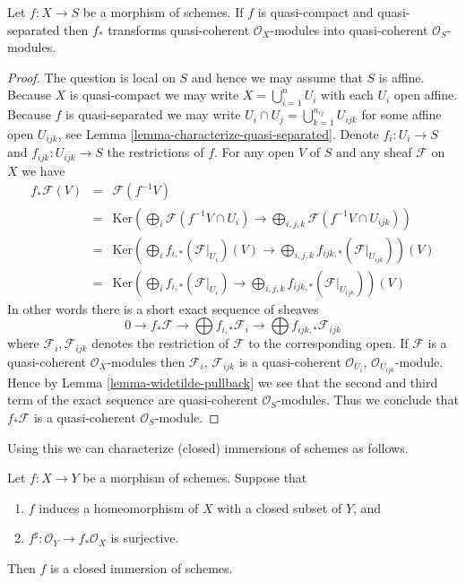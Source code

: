 \begin{lemma}
\label{lemma-push-forward-quasi-coherent}
Let $f : X \to S$ be a morphism of schemes.
If $f$ is quasi-compact and quasi-separated then
$f_*$ transforms quasi-coherent $\mathcal{O}_X$-modules
into quasi-coherent $\mathcal{O}_S$-modules.
\end{lemma}

\begin{proof}
The question is local on $S$ and hence we may assume that
$S$ is affine. Because $X$ is quasi-compact we may write
$X = \bigcup_{i = 1}^n U_i$ with each $U_i$ open affine.
Because $f$ is quasi-separated we may write
$U_i \cap U_j = \bigcup_{k = 1}^{n_{ij}} U_{ijk}$ for some
affine open $U_{ijk}$, see Lemma \ref{lemma-characterize-quasi-separated}.
Denote $f_i : U_i \to S$ and $f_{ijk} : U_{ijk} \to S$ the
restrictions of $f$. For any open $V$ of $S$ and any sheaf
$\mathcal{F}$ on $X$ we have
\begin{eqnarray*}
f_*\mathcal{F}(V) & = & \mathcal{F}(f^{-1}V) \\
& = &
\text{Ker}\left(
\bigoplus\nolimits_i \mathcal{F}(f^{-1}V \cap U_i)
\to
\bigoplus\nolimits_{i, j, k} \mathcal{F}(f^{-1}V \cap U_{ijk})\right) \\
& = &
\text{Ker}\left(
\bigoplus\nolimits_i f_{i, *}(\mathcal{F}|_{U_i})(V)
\to
\bigoplus\nolimits_{i, j, k} f_{ijk, *}(\mathcal{F}|_{U_{ijk}})\right)(V) \\
& = &
\text{Ker}\left(
\bigoplus\nolimits_i f_{i, *}(\mathcal{F}|_{U_i})
\to
\bigoplus\nolimits_{i, j, k} f_{ijk, *}(\mathcal{F}|_{U_{ijk}})\right)(V)
\end{eqnarray*}
In other words there is a short exact sequence of sheaves
$$
0 \to f_*\mathcal{F}
\to \bigoplus f_{i, *}\mathcal{F}_i
\to \bigoplus f_{ijk, *}\mathcal{F}_{ijk}
$$
where $\mathcal{F}_i, \mathcal{F}_{ijk}$ denotes the
restriction of $\mathcal{F}$ to the corresponding open.
If $\mathcal{F}$ is a quasi-coherent $\mathcal{O}_X$-modules
then $\mathcal{F}_i$, $\mathcal{F}_{ijk}$ is a quasi-coherent
$\mathcal{O}_{U_i}$, $\mathcal{O}_{U_{ijk}}$-module.
Hence by Lemma \ref{lemma-widetilde-pullback} we see that the second and
third term of the exact sequence are quasi-coherent
$\mathcal{O}_S$-modules. Thus we conclude that
$f_*\mathcal{F}$ is a quasi-coherent $\mathcal{O}_S$-module.
\end{proof}

\noindent
Using this we can characterize (closed) immersions of schemes
as follows.

\begin{lemma}
\label{lemma-characterize-closed-immersions}
Let $f : X \to Y$ be a morphism of schemes.
Suppose that
\begin{enumerate}
\item $f$ induces a homeomorphism of $X$ with a
closed subset of $Y$, and
\item $f^\sharp : \mathcal{O}_Y \to f_*\mathcal{O}_X$
is surjective.
\end{enumerate}
Then $f$ is a closed immersion of schemes.
\end{lemma}

